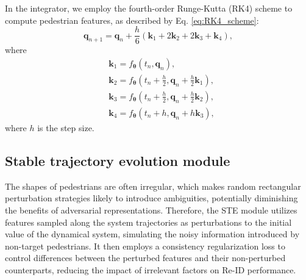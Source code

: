 \documentclass[12pt]{spieman}  %
\begin{document}
\begin{spacing}{2}
		In the integrator, we employ the fourth-order Runge-Kutta (RK4) scheme to compute pedestrian features, as described by Eq. \eqref{eq:RK4_scheme}:
		\begin{equation}
			\label{eq:RK4_scheme}
			\boldsymbol q_{n+1}=\boldsymbol q_n+\frac{h}{6}\left(\boldsymbol k_1+2\boldsymbol k_2+2\boldsymbol k_3+\boldsymbol k_4\right),
		\end{equation}
		where
		\begin{equation}
			\begin{aligned}
				&\boldsymbol k_{1} =f_{\boldsymbol{\theta}} \left(t_n, \boldsymbol q_{n}\right), \\
				&\boldsymbol k_{2} =f_{\boldsymbol{\theta}} \left(t_n+\frac{h}{2}, \boldsymbol q_{n}+\frac{h}{2}\boldsymbol{k}_{1}\right), \\
				&\boldsymbol k_{3} =f_{\boldsymbol{\theta}} \left(t_n+\frac{h}{2}, \boldsymbol q_{n}+\frac{h}{2}\boldsymbol{k}_{2}\right), \\
				&\boldsymbol k_{4} =f_{\boldsymbol{\theta}} \left(t_n+h, \boldsymbol q_{n}+h\boldsymbol{k}_{3}\right),
			\end{aligned}
		\end{equation}
		where $h$ is the step size.
		
		\subsection{Stable trajectory evolution module}
		The shapes of pedestrians are often irregular, which makes random rectangular perturbation strategies likely to introduce ambiguities, potentially diminishing the benefits of adversarial representations. Therefore, the STE module utilizes features sampled along the system trajectories as perturbations to the initial value of the dynamical system, simulating the noisy information introduced by non-target pedestrians. It then employs a consistency regularization loss to control differences between the perturbed features and their non-perturbed counterparts, reducing the impact of irrelevant factors on Re-ID performance.
		

\end{spacing}
\end{document}
